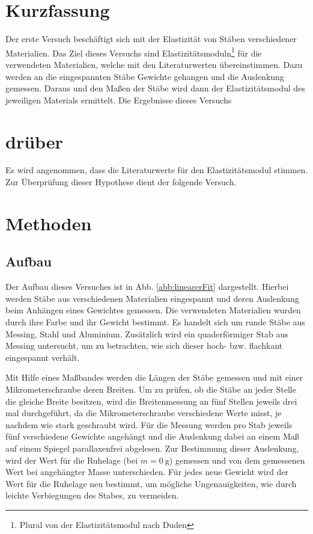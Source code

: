 
	\section{Kurzfassung}
		
		Der erste Versuch beschäftigt sich mit der Elastizität von Stäben verschiedener Materialien. Das Ziel dieses Versuchs sind Elastizitätsmoduln\footnote{Plural von \glqq der Elastizitätsmodul\grqq {} nach Duden} für die verwendeten Materialien, welche mit den Literaturwerten übereinstimmen. Dazu werden an die eingespannten Stäbe Gewichte gehangen und die Auslenkung gemessen. Daraus und den Maßen der Stäbe wird dann der Elastizitätsmodul des jeweiligen Materials ermittelt. Die Ergebnisse dieses Versuchs %
	
	\section*{drüber}
	
		Es wird angenommen, dass die Literaturwerte für den Elastizitätsmodul stimmen. Zur Überprüfung dieser Hypothese dient der folgende Versuch.		
		
	\section{Methoden}
		
		\subsection*{Aufbau}
		Der Aufbau dieses Versuches ist in Abb. \ref{abb:linearerFit} dargestellt. Hierbei werden Stäbe aus verschiedenen Materialien eingespannt und deren Auslenkung beim Anhängen eines Gewichtes gemessen. 
		Die verwendeten Materialien wurden durch ihre Farbe und ihr Gewicht bestimmt. Es handelt sich um runde Stäbe aus Messing, Stahl und Aluminium. Zusätzlich wird ein quaderförmiger Stab aus Messing untersucht, um zu betrachten, wie sich dieser hoch- bzw. flachkant eingespannt verhält.
		
		Mit Hilfe eines Maßbandes werden die Längen der Stäbe gemessen und mit einer Mikrometerschraube deren Breiten. Um zu prüfen, ob die Stäbe an jeder Stelle die gleiche Breite besitzen, wird die Breitenmessung an fünf Stellen jeweils drei mal durchgeführt, da die Mikrometerschraube verschiedene Werte misst, je nachdem wie stark geschraubt wird. 
		Für die Messung werden pro Stab jeweils fünf verschiedene Gewichte angehängt und die Auslenkung dabei an einem Maß auf einem Spiegel parallaxenfrei abgelesen. Zur Bestimmung dieser Auslenkung, wird der Wert für die Ruhelage (bei $m=\SI{0}{\g}$) gemessen und von dem gemessenen Wert bei angehängter Masse unterschieden. Für jedes neue Gewicht wird der Wert für die Ruhelage neu bestimmt, um mögliche Ungenauigkeiten, wie durch leichte Verbiegungen des Stabes, zu vermeiden.
		

